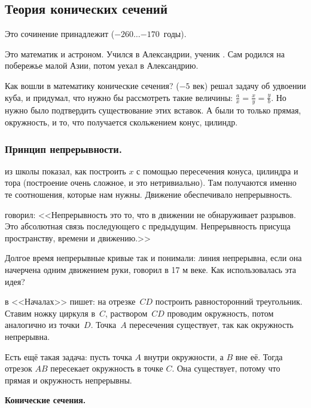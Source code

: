 \documentclass[a4paper,oneside,fleqn,10pt]{article}
\newcommand{\pe}[2]{${#1}\ldots{#2}$}
\begin{document}

\subsection{Теория конических сечений}

\label{sec:conicae}

Это сочинение принадлежит  (\pe{-260}{-170}~годы).

Это математик и астроном. Учился в Александрии, ученик
. Сам родился на побережье малой Азии, потом
уехал в Александрию.

Как вошли в математику конические сечения? 
($-5$ век) решал задачу об удвоении куба, и придумал, что нужно бы
рассмотреть такие величины: $\frac ax = \frac xy = \frac yb$. Но нужно
было подтвердить существование этих вставок.  А были то только прямая,
окружность, и то, что получается скольжением конус, цилиндр.

\subsubsection{Принцип непрерывности.}

 из школы  показал, как построить
$x$ с помощью пересечения конуса, цилиндра и тора (построение очень
сложное, и это нетривиально).  Там получаются именно те соотношения,
которые нам нужны.  Движение обеспечивало непрерывность.

 говорил: <<Непрерывность это то, что в движении не
обнаруживает разрывов.  Это абсолютная связь последующего с
предыдущим. Непрерывность присуща пространству, времени и движению.>>

Долгое время непрерывные кривые так и понимали: линия непрерывна, если
она начерчена одним движением руки, говорил  в 17 м веке.
Как использовалась эта идея?

 в <<Началах>> пишет: на отрезке~$CD$ построить
равносторонний треугольник.  Ставим ножку циркуля в~$C$,
раствором~$CD$ проводим окружность, потом аналогично из
точки~$D$. Точка~$A$ пересечения существует, так как окружность
непрерывна.

Есть ещё такая задача: пусть точка $A$ внутри окружности, а $B$ вне
её. Тогда отрезок $AB$ пересекает окружность в точке $C$. Она
существует, потому что прямая и окружность непрерывны.

\textbf{Конические сечения.}
\end{document}

